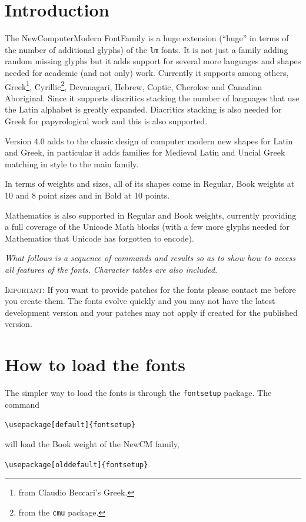 \documentclass{article}
\begin{document}
\section{Introduction}
The NewComputerModern FontFamily is a huge extension (``huge'' in terms of
the number of additional glyphs)
of the \verb|lm| fonts. It is not just a family adding random missing glyphs but it
adds support for several more languages and shapes needed for academic (and not only) work.
Currently it supports among others, Greek\footnote{from Claudio Beccari's Greek.},
Cyrillic\footnote{from the \texttt{cmu} package.}, Devanagari, Hebrew, Coptic, Cherokee and
Canadian Aboriginal. Since it supports
diacritics stacking the number of languages that use the Latin alphabet is greatly expanded. 
Diacritics stacking is also needed for Greek for papyrological work and this is also supported.

Version 4.0 adds to the classic design of computer modern new shapes for Latin and Greek,
in particular it adds families for Medieval Latin and Uncial Greek matching in style to the
main family.

In terms of weights and sizes, all of its shapes come in Regular, Book weights
at 10 and 8 point sizes and in Bold at 10 points.

Mathematics is also supported in Regular and Book weights, currently providing
a full coverage of the Unicode Math blocks (with a few more glyphs needed for Mathematics
that Unicode has forgotten to encode).

\textit{What follows is a sequence of commands and results so as to show how to access all features
of the fonts. Character tables are also included}.

\textsc{Important:} If you want to provide patches for the fonts
please contact me before you create them. The fonts evolve quickly
and you may not have the latest development version and your patches
may not apply if created for the published version.


\section{How to load the fonts}
The simpler way to load the fonts is through the \verb|fontsetup| package. The command

\verb|\usepackage[default]{fontsetup}|

\noindent will load the Book weight of the NewCM family, 

\verb|\usepackage[olddefault]{fontsetup}|
\end{document}

